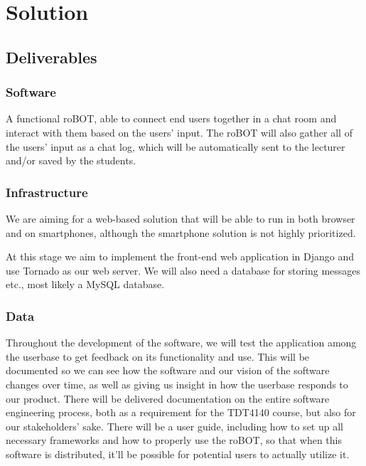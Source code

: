 \section{Solution}

\subsection{Deliverables}
\subsubsection{Software}
A functional roBOT, able to connect end users together in a chat room and interact with them based on the users' input. The roBOT will also gather all of the users' input as a chat log, which will be automatically sent to the lecturer and/or saved by the students. 

\subsubsection{Infrastructure}
We are aiming for a web-based solution that will be able to run in both browser and on smartphones, although the smartphone solution is not highly prioritized. 

At this stage we aim to implement the front-end web application in Django and use Tornado as our web server. We will also need a database for storing messages etc., most likely a MySQL database. 


\subsubsection{Data} 
Throughout the development of the software, we will test the application among the userbase to get feedback on its functionality and use.
This will be documented so we can see how the software and our vision of the software changes over time, as well as giving us insight in how the userbase responds to our product.
There will be delivered documentation on the entire software engineering process, both as a requirement for the TDT4140 course, but also for our stakeholders' sake.
There will be a user guide, including how to set up all necessary frameworks and how to properly use the roBOT, so that when this software is distributed, it'll be possible for potential users to actually utilize it.


